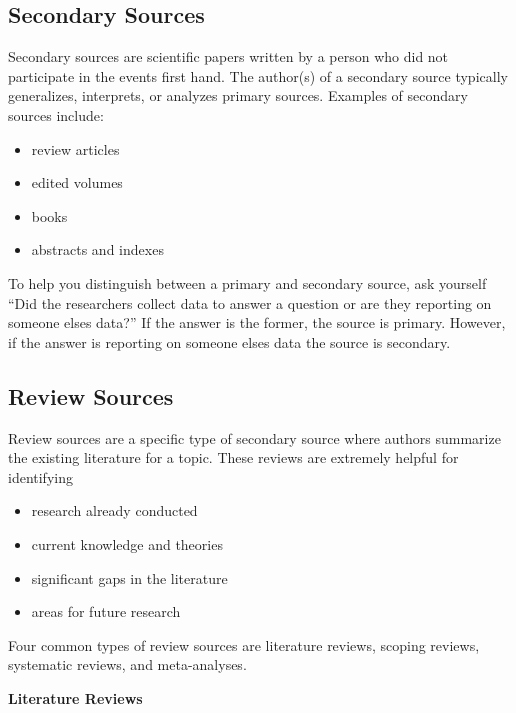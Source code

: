 \documentclass[
]{book}
\providecommand{\tightlist}{%
  \setlength{\itemsep}{0pt}\setlength{\parskip}{0pt}}
\begin{document}
\subsection*{Secondary Sources}\label{secondary-sources}

Secondary sources are scientific papers written by a person who did not participate in the events first hand. The author(s) of a secondary source typically generalizes, interprets, or analyzes primary sources. Examples of secondary sources include:

\begin{itemize}
\tightlist
\item
  review articles
\item
  edited volumes
\item
  books
\item
  abstracts and indexes
\end{itemize}

To help you distinguish between a primary and secondary source, ask yourself ``Did the researchers collect data to answer a question or are they reporting on someone else\textquotesingle s data?'' If the answer is the former, the source is primary. However, if the answer is reporting on someone else\textquotesingle s data the source is secondary.

\subsection*{Review Sources}\label{review-sources}

Review sources are a specific type of secondary source where authors summarize the existing literature for a topic. These reviews are extremely helpful for identifying

\begin{itemize}
\tightlist
\item
  research already conducted
\item
  current knowledge and theories
\item
  significant gaps in the literature
\item
  areas for future research
\end{itemize}

Four common types of review sources are literature reviews, scoping reviews, systematic reviews, and meta-analyses.

\textbf{Literature Reviews}
\end{document}
